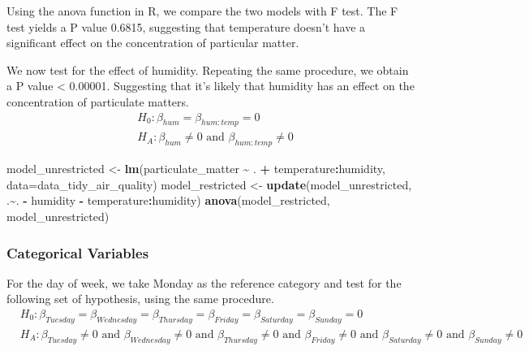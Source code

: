\documentclass[
]{article}
\newenvironment{Shaded}{\begin{snugshade}}{\end{snugshade}}
\newcommand{\AttributeTok}[1]{\textcolor[rgb]{0.13,0.29,0.53}{#1}}
\newcommand{\FunctionTok}[1]{\textcolor[rgb]{0.13,0.29,0.53}{\textbf{#1}}}
\newcommand{\NormalTok}[1]{#1}
\newcommand{\OtherTok}[1]{\textcolor[rgb]{0.56,0.35,0.01}{#1}}
\newcommand{\SpecialCharTok}[1]{\textcolor[rgb]{0.81,0.36,0.00}{\textbf{#1}}}
\begin{document}
Using the anova function in R, we compare the two models with F test.
The F test yields a P value 0.6815, suggesting that temperature doesn't
have a significant effect on the concentration of particular matter.

We now test for the effect of humidity. Repeating the same procedure, we
obtain a P value \textless{} 0.00001. Suggesting that it's likely that
humidity has an effect on the concentration of particulate matters. \[
\begin{aligned}
&H_0: \beta_{hum} = \beta_{hum:temp} = 0 \\
&H_A: \beta_{hum} \neq 0 \text{ and } \beta_{hum:temp} \neq 0
\end{aligned}
\]

\begin{Shaded}
\begin{Highlighting}[]
\NormalTok{model\_unrestricted }\OtherTok{\textless{}{-}} \FunctionTok{lm}\NormalTok{(particulate\_matter }\SpecialCharTok{\textasciitilde{}}\NormalTok{ . }\SpecialCharTok{+} 
\NormalTok{                         temperature}\SpecialCharTok{:}\NormalTok{humidity,}
                         \AttributeTok{data=}\NormalTok{data\_tidy\_air\_quality)}
\NormalTok{model\_restricted }\OtherTok{\textless{}{-}} \FunctionTok{update}\NormalTok{(model\_unrestricted, .}\SpecialCharTok{\textasciitilde{}}\NormalTok{.}
                           \SpecialCharTok{{-}}\NormalTok{ humidity}
                           \SpecialCharTok{{-}}\NormalTok{ temperature}\SpecialCharTok{:}\NormalTok{humidity)}
\FunctionTok{anova}\NormalTok{(model\_restricted, model\_unrestricted)}
\end{Highlighting}
\end{Shaded}

\hypertarget{categorical-variables}{%
\subsubsection{Categorical Variables}\label{categorical-variables}}

For the day of week, we take Monday as the reference category and test
for the following set of hypothesis, using the same procedure. \[
\begin{aligned}
&H_0: \beta_{Tuesday} = \beta_{Wednesday} = \beta_{Thursday} = \beta_{Friday} = \beta_{Saturday} = \beta_{Sunday} = 0 \\
&H_A: \beta_{Tuesday} \neq 0 \text{ and } \beta_{Wednesday} \neq 0 \text{ and } \beta_{Thursday} \neq 0 \text{ and } \beta_{Friday} \neq 0 \text{ and } \beta_{Saturday} \neq 0 \text{ and } \beta_{Sunday} \neq 0
\end{aligned}
\]
\end{document}
